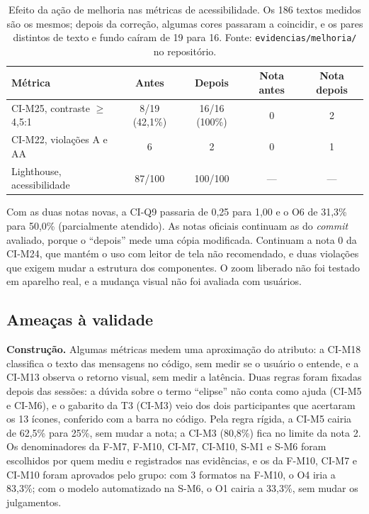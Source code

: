 \documentclass[conference]{IEEEtran}
\begin{document}
\begin{table}[!t]
\caption{Efeito da ação de melhoria nas métricas de acessibilidade. Os 186 textos medidos são os mesmos; depois da correção, algumas cores passaram a coincidir, e os pares distintos de texto e fundo caíram de 19 para 16. Fonte: \texttt{evidencias/melhoria/} no repositório.}
\label{tab:melhoria}
\centering
\scriptsize
\setlength{\tabcolsep}{3pt}
\begin{tabular}{@{}L{2.3cm} c c c c@{}}
\toprule
\textbf{Métrica} & \textbf{Antes} & \textbf{Depois} & \textbf{Nota antes} & \textbf{Nota depois}\\
\midrule
CI-M25, contraste $\geq$\,4,5:1 & 8/19 (42,1\%) & 16/16 (100\%) & 0 & 2\\
CI-M22, violações A e AA & 6 & 2 & 0 & 1\\
Lighthouse, acessibilidade & 87/100 & 100/100 & --- & ---\\
\bottomrule
\end{tabular}
\end{table}

Com as duas notas novas, a CI-Q9 passaria de 0,25 para 1,00 e o O6 de
31,3\% para 50,0\% (parcialmente atendido). As notas oficiais continuam as
do \textit{commit} avaliado, porque o ``depois'' mede uma cópia modificada.
Continuam a nota 0 da CI-M24, que mantém o uso com leitor de tela não
recomendado, e duas violações que exigem mudar a estrutura dos componentes.
O zoom liberado não foi testado em aparelho real, e a mudança visual não foi
avaliada com usuários.

\subsection{Ameaças à validade}
\label{sec:ameacas}

\textbf{Construção.} Algumas métricas medem uma aproximação do atributo: a
CI-M18 classifica o texto das mensagens no código, sem medir se o usuário o
entende, e a CI-M13 observa o retorno visual, sem medir a latência. Duas
regras foram fixadas depois das sessões: a dúvida sobre o termo ``elipse''
não conta como ajuda (CI-M5 e CI-M6), e o gabarito da T3 (CI-M3) veio dos dois
participantes que acertaram os 13 ícones, conferido com a barra no código.
Pela regra rígida, a CI-M5 cairia de 62,5\% para 25\%, sem mudar a nota; a
CI-M3 (80,8\%) fica no limite da nota 2. Os denominadores da F-M7, F-M10,
CI-M7, CI-M10, S-M1 e S-M6 foram escolhidos por quem mediu e registrados nas
evidências, e os da F-M10, CI-M7 e CI-M10 foram aprovados pelo grupo: com 3
formatos na F-M10, o O4 iria a 83,3\%;
com o modelo automatizado na S-M6, o O1 cairia a 33,3\%, sem mudar os
julgamentos.
\end{document}
